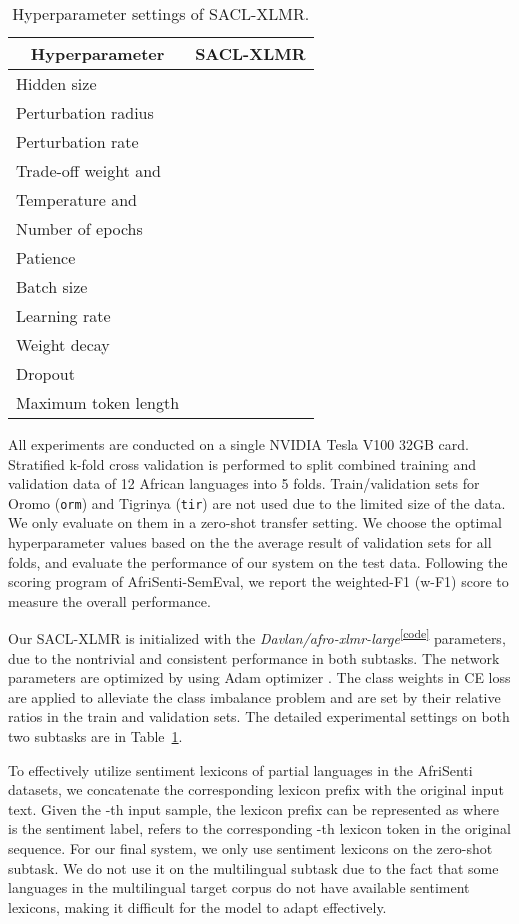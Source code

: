 \documentclass[11pt]{article}
\begin{document}
\begin{table}[t]
\centering
\begin{tabular}{l|c}
\hline 
\multicolumn{1}{c|}{Hyperparameter}    &  SACL-XLMR  \\ \hline
Hidden size \textbf{} &  \\ 
Perturbation radius   &   \\  
Perturbation rate  &   \\
Trade-off weight  and   &  \\ 
Temperature  and   &  \\ \hline 
Number of epochs &  \\
Patience &  \\ 
Batch size &  \\
Learning rate   &   \\ 
Weight decay &   \\ 
Dropout &  \\
Maximum token length &  \\
\hline
\end{tabular}
\caption{Hyperparameter settings of SACL-XLMR.}
\label{tab:param}
\end{table}

All experiments are conducted on a single NVIDIA Tesla V100 32GB card. 
Stratified k-fold cross validation  \citep{DBLP:conf/ijcai/Kohavi95} is performed to split combined training and validation data of 12 African languages into 5 folds. Train/validation sets for Oromo (\texttt{orm}) and Tigrinya (\texttt{tir}) are not used due to the limited size of the data. We only evaluate on them in a zero-shot transfer setting.
We choose the optimal hyperparameter values based on the the average result of validation sets for all folds, and evaluate the performance of our system on the test data.
Following the scoring program of AfriSenti-SemEval, we report the weighted-F1 (w-F1) score to measure the overall performance.

Our SACL-XLMR is initialized with the \textit{Davlan/afro-xlmr-large}\textsuperscript{\ref{code}} parameters, due to the nontrivial and consistent performance in both subtasks.
The network parameters are optimized by using Adam optimizer \citep{DBLP:journals/corr/KingmaB14}.
The class weights in CE loss are applied to alleviate the class imbalance problem 
and are set by their relative ratios in the train and validation sets.
The detailed experimental settings on both two subtasks are in Table~\ref{tab:param}.

To effectively utilize sentiment lexicons of partial languages in
the AfriSenti datasets, we concatenate the corresponding lexicon prefix with the original input text. Given the -th input sample, the lexicon prefix can be represented as 
 where  is the sentiment label,  refers to the corresponding -th lexicon token in the original sequence. 
For our final system, we only use sentiment lexicons on the zero-shot subtask. We do not use it on the multilingual subtask due to the fact that some languages in the multilingual target corpus do not have available sentiment lexicons, making it difficult for the model to adapt effectively.
\end{document}

